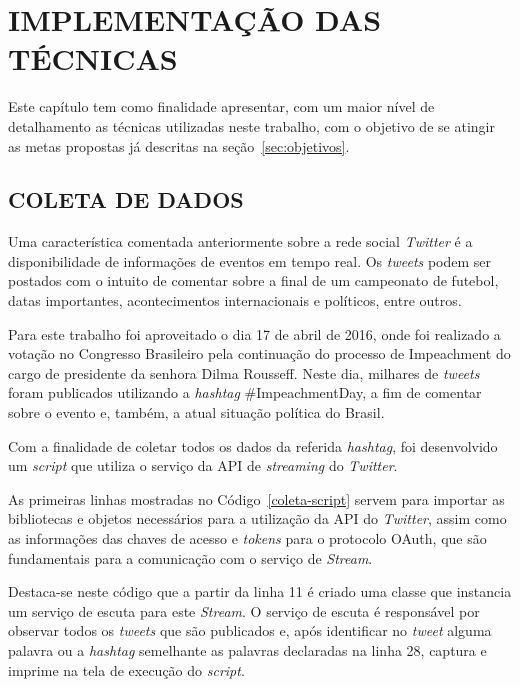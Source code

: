 \chapter{IMPLEMENTAÇÃO DAS TÉCNICAS}\label{ch:implementacao}

Este capítulo tem como finalidade apresentar, com um maior nível de detalhamento as técnicas utilizadas neste trabalho, com o objetivo de se atingir as metas propostas já descritas na seção~\ref{sec:objetivos}.

\section{COLETA DE DADOS}
Uma característica comentada anteriormente sobre a rede social \textit{Twitter} é a disponibilidade de informações de eventos em tempo real. Os \textit{tweets} podem ser postados com o intuito de comentar sobre a final de um campeonato de futebol, datas importantes, acontecimentos internacionais e políticos, entre outros.

Para este trabalho foi aproveitado o dia 17 de abril de 2016, onde foi realizado a votação no Congresso Brasileiro pela continuação do processo de Impeachment do cargo de presidente da senhora Dilma Rousseff. Neste dia, milhares de \textit{tweets} foram publicados utilizando a \textit{hashtag} \#ImpeachmentDay, a fim de comentar sobre o evento e, também, a atual situação política do Brasil.

Com a finalidade de coletar todos os dados da referida \textit{hashtag}, foi desenvolvido um \textit{script} que utiliza o serviço da API de \textit{streaming} do \textit{Twitter}.

As primeiras linhas mostradas no Código~\ref{coleta-script} servem para importar as bibliotecas e objetos necessários para a utilização da API do \textit{Twitter}, assim como as informações das chaves de acesso e \textit{tokens} para o protocolo OAuth, que são fundamentais para a comunicação com o serviço de \textit{Stream}.



Destaca-se neste código que a partir da linha 11 é criado uma classe que instancia um serviço de escuta para este \textit{Stream}. O serviço de escuta é responsável por observar todos os \textit{tweets} que são publicados e, após identificar no \textit{tweet} alguma palavra ou a \textit{hashtag} semelhante as palavras declaradas na linha 28, captura e imprime na tela de execução do \textit{script}.

